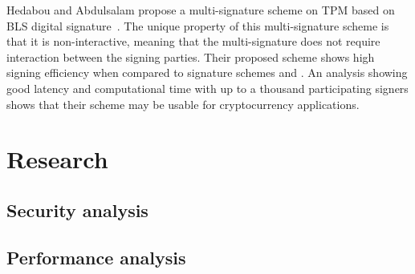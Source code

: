Hedabou and Abdulsalam \cite{hedabou2020efficient} propose a multi-signature scheme on TPM based on BLS digital signature~\cite{blsSignatures}. The unique property of this multi-signature scheme is that it is non-interactive, meaning that the multi-signature does not require interaction between the signing parties. Their proposed scheme shows high signing efficiency when compared to signature schemes \cite{chen2013flexible} and \cite{schnorrSpec}. An analysis showing good latency and computational time with up to a thousand participating signers shows that their scheme may be usable for cryptocurrency applications.





\section{Research}

\subsection{Security analysis}

\subsection{Performance analysis}

